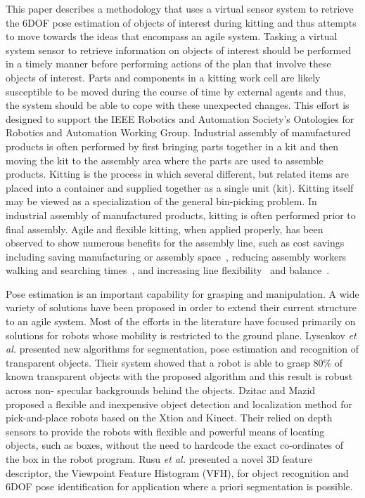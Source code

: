 This paper describes a methodology that uses a virtual sensor system to retrieve the 6DOF pose estimation of objects of interest during kitting and thus attempts to move towards the ideas that encompass an agile system. Tasking a virtual system sensor to retrieve information on objects of interest should be performed in a timely manner before performing actions of the plan that involve these objects of interest. Parts and components in a kitting work cell are likely susceptible to be moved during the course of time by external agents and thus, the system should be able to cope with these unexpected changes. This effort is designed to support the IEEE Robotics and Automation Society's Ontologies for Robotics and Automation Working Group. Industrial assembly of manufactured products is often performed by first bringing parts together in a kit and then moving the kit to the assembly area where the parts are used to assemble products. Kitting is the process in which several different, but related items are placed into a container and supplied together as a single unit (kit). Kitting itself may be viewed as a specialization of the general bin-picking problem. In industrial assembly of manufactured products, kitting is often performed prior to final assembly. Agile and flexible kitting, when applied properly, has been observed to show numerous benefits for the assembly line, such as cost savings~\cite{Carlsson_2008} including saving manufacturing or assembly space~\cite{Medbo2003}, reducing assembly workers walking and searching times~\cite{Schwind1992}, and increasing line flexibility~\cite{Bozer1992} and balance~\cite{Jiao2000}.

Pose estimation is an important capability for grasping and manipulation. A wide variety of solutions have been proposed in order to extend their current structure to an agile system. Most of the efforts in the literature have focused primarily on solutions for robots whose mobility is restricted to the ground plane. Lysenkov \textit{et al.} \cite{Lysenkov-RSS-12} presented new algorithms for segmentation, pose estimation and recognition of transparent objects. Their system showed that a robot is able to grasp 80\% of known transparent objects with the proposed algorithm and this result is robust across non- specular backgrounds behind the objects. Dzitac and Mazid~\cite{Dzitac.ICARCV.2012} proposed a flexible and inexpensive object detection and localization method for pick-and-place robots based on the Xtion and Kinect. Their relied on depth sensors to provide the robots with flexible and powerful means of locating objects, such as boxes, without the need to hardcode the exact co-ordinates of the box in the robot program. Rusu \textit{et al.} \cite{RUSU.IROS.2010}  presented a novel 3D feature descriptor, the Viewpoint Feature Histogram (VFH), for object recognition and 6DOF pose identification for application where a priori segmentation is possible. 

